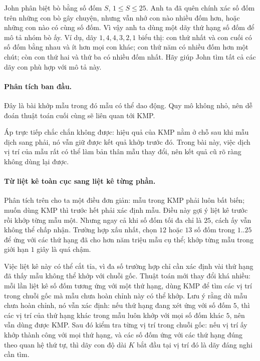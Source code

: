 \documentclass[11pt]{article}
\begin{document}
John phân biệt bò bằng số đốm \(S\), \(1\le S\le 25\). Anh ta đã quên chính
xác số đốm trên những con bò gây chuyện, nhưng vẫn nhớ con nào nhiều đốm hơn,
hoặc những con nào có cùng số đốm. Vì vậy anh ta dùng một dãy thứ hạng số đốm
để mô tả nhóm bò ấy. Ví dụ, dãy \(1,4,4,3,2,1\) biểu thị: con thứ nhất và con
cuối có số đốm bằng nhau và ít hơn mọi con khác; con thứ năm có nhiều đốm hơn
một chút; còn con thứ hai và thứ ba có nhiều đốm nhất. Hãy giúp John tìm tất
cả các dãy con phù hợp với mô tả này.

\paragraph{Phân tích ban đầu.}
Đây là bài khớp mẫu trong đó mẫu có thể dao động. Quy mô không nhỏ, nên dễ
đoán thuật toán cuối cùng sẽ liên quan tới KMP.

Áp trực tiếp chắc chắn không được: hiệu quả của KMP nằm ở chỗ sau khi mẫu
dịch sang phải, nó vẫn giữ được kết quả khớp trước đó. Trong bài này, việc
dịch vị trí của mẫu rất có thể làm bản thân mẫu thay đổi, nên kết quả cũ rõ
ràng không dùng lại được.

\paragraph{Từ liệt kê toàn cục sang liệt kê từng phần.}
Phân tích trên cho ta một điều đơn giản: mẫu trong KMP phải luôn bất biến; muốn
dùng KMP thì trước hết phải xác định mẫu. Điều này gợi ý liệt kê trước rồi
khớp từng mẫu một. Nhưng ngay cả khi số đốm tối đa chỉ là \(25\), cách ấy vẫn
không thể chấp nhận. Trường hợp xấu nhất, chọn \(12\) hoặc \(13\) số đốm trong
\(1..25\) để ứng với các thứ hạng đã cho hơn năm triệu mẫu cụ thể; khớp từng
mẫu trong giới hạn \(1\) giây là quá chậm.

Việc liệt kê này có thể cắt tỉa, vì đa số trường hợp chỉ cần xác định vài thứ
hạng đã thấy mẫu không thể khớp với chuỗi gốc. Thuật toán mới thay đổi khá
nhiều: mỗi lần liệt kê số đốm tương ứng với một thứ hạng, dùng KMP để tìm các
vị trí trong chuỗi gốc mà mẫu chưa hoàn chỉnh này có thể khớp. Lưu ý rằng dù
mẫu chưa hoàn chỉnh, nó vẫn xác định: nếu thứ hạng đang xét ứng với số đốm
\(5\), thì các vị trí của thứ hạng khác trong mẫu luôn khớp với mọi số đốm
khác \(5\), nên vẫn dùng được KMP. Sau đó kiểm tra từng vị trí trong chuỗi
gốc: nếu vị trí ấy khớp thành công với mọi thứ hạng, và các số đốm ứng với
các thứ hạng đúng theo quan hệ thứ tự, thì dãy con độ dài \(K\) bắt đầu tại
vị trí đó là dãy đáng nghi cần tìm.
\end{document}
